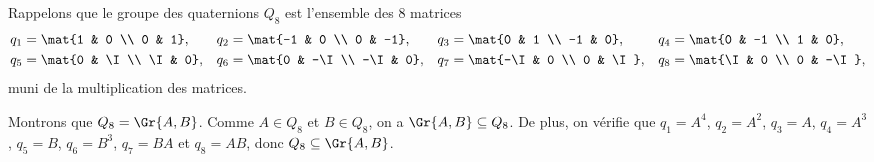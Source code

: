 Rappelons que le groupe des quaternions $Q_8$ est l'ensemble des $8$ matrices
%
\begin{align*}
  q_1 &= \mat{1 & 0 \\ 0 & 1}, & q_2 &= \mat{-1 & 0 \\ 0 & -1},
                              & q_3 &= \mat{0 & 1 \\ -1 & 0},
                              & q_4 &= \mat{0 & -1 \\ 1 & 0}, \\
  q_5 &= \mat{0 & \I \\ \I & 0}, & q_6 &= \mat{0 & -\I \\ -\I & 0},
                                & q_7 &= \mat{-\I & 0 \\ 0 & \I},
                                & q_8 &= \mat{\I & 0 \\ 0 & -\I},
\end{align*}
%
muni de la multiplication des matrices.

Montrons que $Q_8 = \Gr{A,B}$. Comme $A\in Q_8$ et $B\in Q_8$, on a
$\Gr{A,B}\subseteq Q_8$.
De plus, on vérifie que
$q_1 = A^4$, $q_2 = A^2$, $q_3 = A$, $q_4 = A^3$, $q_5 = B$,
$q_6 = B^3$, $q_7 = BA$ et $q_8 = AB$,
donc $Q_8\subseteq \Gr{A,B}$.
